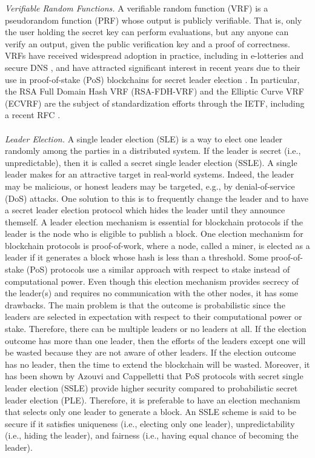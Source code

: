 \emph{Verifiable Random Functions.}
A verifiable random function (VRF) \cite{vrf_micali} is a pseudorandom function (PRF) whose output is publicly verifiable.
That is, only the user holding the secret key can perform evaluations, but any anyone can
verify an output, given the public verification key and a proof of correctness.
VRFs have received widespread adoption in practice, including in e-lotteries \cite{MicaliR02,LiangBM20} and secure DNS \cite{GoldbergNPRVZ15,PapadopoulosWHNVRG17}, and have attracted significant interest in recent years due to their use in proof-of-stake (PoS) blockchains for secret leader election \cite{ChenM19,KiayiasRDO17,DavidGKR17,BurdgesASV23a}.
In particular, the RSA Full Domain Hash VRF (RSA-FDH-VRF) and the Elliptic Curve VRF (ECVRF) are the subject of standardization efforts through the IETF, including a recent RFC \cite{VRF-RFC}.
\\\\
\noindent \emph{Leader Election.} 
A single leader election (SLE) is a way to elect one leader randomly among the
parties in a distributed system. If the leader is secret (i.e., unpredictable), then it is called
a secret single leader election (SSLE).
A single leader makes for an attractive target in real-world systems. Indeed, the leader may be malicious, or honest leaders may be targeted, e.g.,
by denial-of-service (DoS) attacks. One solution to this is to frequently change the leader and
to have a secret leader election protocol which hides the leader until they announce themself.
A leader election mechanism is essential for blockchain protocols if the leader is
the node who is eligible to publish a block.
One election mechanism for blockchain protocols is proof-of-work, where a node, called a miner, is elected as a leader if it generates a block whose hash is less than a threshold. Some
proof-of-stake (PoS) protocols use a similar approach with respect to stake instead of computational power. Even though this election mechanism provides secrecy of
the leader(s) and requires no communication with the other nodes, it has some drawbacks. The
main problem is that the outcome is probabilistic since the leaders are selected in expectation
with respect to their computational power or stake. Therefore, there can be multiple leaders or
no leaders at all. If the election outcome has more than one leader, then the efforts of the leaders
except one will be wasted because they are not aware of other leaders. If the election outcome has
no leader, then the time to extend the blockchain will be wasted. Moreover,
it has been shown by Azouvi and Cappelletti  that PoS protocols with secret single leader
election (SSLE) provide higher security compared to probabilistic secret leader election (PLE).
Therefore, it is preferable to have an election mechanism that selects only one leader to generate a
block.
An SSLE scheme is said to be secure \cite{BonehEHG20} if it satisfies uniqueness (i.e., electing only one leader), unpredictability (i.e., hiding the leader), and fairness (i.e., having equal chance of becoming the leader).

